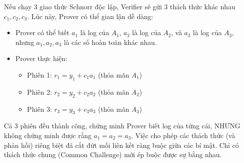 Nếu chạy 3 giao thức Schnorr độc lập, Verifier sẽ gửi 3 thách thức khác nhau $c_1, c_2, c_3$.
Lúc này, Prover có thể gian lận dễ dàng:
\begin{itemize}
    \item Prover có thể biết $a_1$ là log của $A_1$, $a_2$ là log của $A_2$, và $a_3$ là log của $A_3$, nhưng $a_1, a_2, a_3$ là các số hoàn toàn khác nhau.
    \item Prover thực hiện:
        \begin{itemize}
            \item Phiên 1: $r_1 = y_1 + c_1 a_1$ (thỏa mãn $A_1$)
            \item Phiên 2: $r_2 = y_2 + c_2 a_2$ (thỏa mãn $A_2$)
            \item Phiên 3: $r_3 = y_3 + c_3 a_3$ (thỏa mãn $A_3$)
        \end{itemize}
\end{itemize}
Cả 3 phiên đều thành công, chứng minh Prover biết log của từng cái, NHƯNG không chứng minh được rằng $a_1 = a_2 = a_3$. Việc cho phép các thách thức (và phản hồi) riêng biệt đã cắt đứt mối liên kết ràng buộc giữa các bí mật. Chỉ có thách thức chung (Common Challenge) mới ép buộc được sự bằng nhau.
